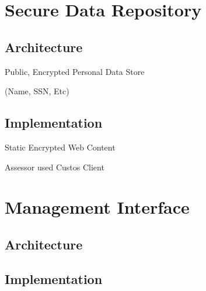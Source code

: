 \section{Secure Data Repository}

\subsection{Architecture}

Public, Encrypted Personal Data Store

(Name, SSN, Etc)

\subsection{Implementation}

Static Encrypted Web Content

Assessor used Custos Client

\section{Management Interface}

\subsection{Architecture}

\subsection{Implementation}

